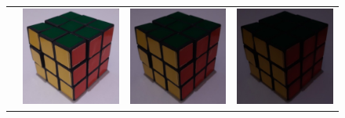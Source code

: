 \begin{figure}
    \newlength{\rubiklength}
    \newlength{\raiselength}
    \setlength{\rubiklength}{3cm}
    \setlength{\raiselength}{1.4cm}
    \centering
    \begin{tabular}{rccc}
         \raisebox{\raiselength}{Original} &
         \includegraphics[width=\rubiklength]{img/rubik/1_orig.jpg} & 
         \includegraphics[width=\rubiklength]{img/rubik/2_orig.jpg} & \includegraphics[width=\rubiklength]{img/rubik/3_orig.jpg}\\
         

\end{tabular}
\end{figure}
